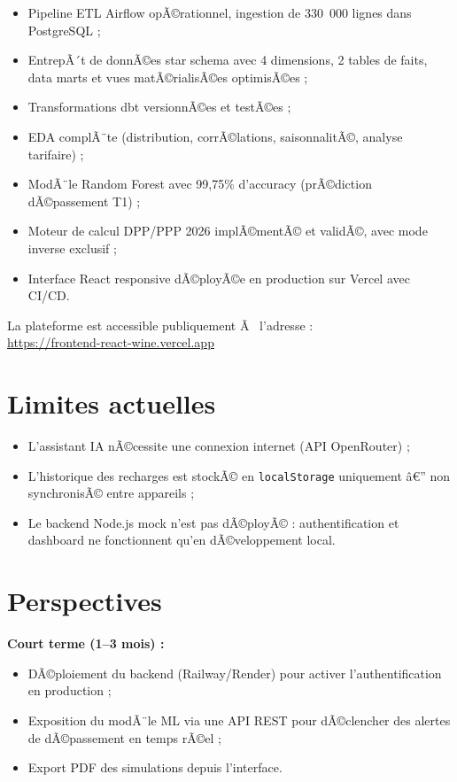 \documentclass[12pt,a4paper]{report}
\begin{document}
\begin{itemize}
  \item[$\checkmark$] Pipeline ETL Airflow opÃ©rationnel, ingestion de 330~000 lignes dans PostgreSQL ;
  \item[$\checkmark$] EntrepÃ´t de donnÃ©es star schema avec 4 dimensions, 2 tables de faits, data marts et vues matÃ©rialisÃ©es optimisÃ©es ;
  \item[$\checkmark$] Transformations dbt versionnÃ©es et testÃ©es ;
  \item[$\checkmark$] EDA complÃ¨te (distribution, corrÃ©lations, saisonnalitÃ©, analyse tarifaire) ;
  \item[$\checkmark$] ModÃ¨le Random Forest avec 99,75\% d'accuracy (prÃ©diction dÃ©passement T1) ;
  \item[$\checkmark$] Moteur de calcul DPP/PPP 2026 implÃ©mentÃ© et validÃ©, avec mode inverse exclusif ;
  \item[$\checkmark$] Interface React responsive dÃ©ployÃ©e en production sur Vercel avec CI/CD.
\end{itemize}

La plateforme est accessible publiquement Ã  l'adresse : \\
\url{https://frontend-react-wine.vercel.app}

\section{Limites actuelles}

\begin{itemize}
  \item L'assistant IA nÃ©cessite une connexion internet (API OpenRouter) ;
  \item L'historique des recharges est stockÃ© en \texttt{localStorage} uniquement â€” non synchronisÃ© entre appareils ;
  \item Le backend Node.js mock n'est pas dÃ©ployÃ© : authentification et dashboard ne fonctionnent qu'en dÃ©veloppement local.
\end{itemize}

\section{Perspectives}

\textbf{Court terme (1--3 mois) :}
\begin{itemize}
  \item DÃ©ploiement du backend (Railway/Render) pour activer l'authentification en production ;
  \item Exposition du modÃ¨le ML via une API REST pour dÃ©clencher des alertes de dÃ©passement en temps rÃ©el ;
  \item Export PDF des simulations depuis l'interface.
\end{itemize}
\end{document}
